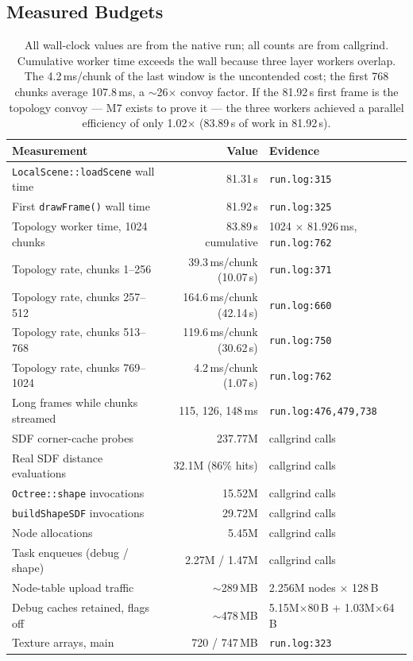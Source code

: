 \documentclass[11pt,a4paper]{article}
\begin{document}
\clearpage
\subsection{Measured Budgets}

\begin{table}[h]
\centering
\small
\begin{tabular}{@{}p{6.1cm}rp{5.0cm}@{}}
\toprule
\textbf{Measurement} & \textbf{Value} & \textbf{Evidence} \\
\midrule
\texttt{LocalScene::loadScene} wall time & 81.31\,s & \texttt{run.log:315} \\
First \texttt{drawFrame()} wall time & 81.92\,s & \texttt{run.log:325} \\
Topology worker time, 1024 chunks & 83.89\,s cumulative & 1024 $\times$ 81.926\,ms, \texttt{run.log:762} \\
Topology rate, chunks 1--256 & 39.3\,ms/chunk (10.07\,s) & \texttt{run.log:371} \\
Topology rate, chunks 257--512 & 164.6\,ms/chunk (42.14\,s) & \texttt{run.log:660} \\
Topology rate, chunks 513--768 & 119.6\,ms/chunk (30.62\,s) & \texttt{run.log:750} \\
Topology rate, chunks 769--1024 & 4.2\,ms/chunk (1.07\,s) & \texttt{run.log:762} \\
Long frames while chunks streamed & 115, 126, 148\,ms & \texttt{run.log:476,479,738} \\
SDF corner-cache probes & 237.77M & callgrind calls \\
Real SDF distance evaluations & 32.1M (86\% hits) & callgrind calls \\
\texttt{Octree::shape} invocations & 15.52M & callgrind calls \\
\texttt{buildShapeSDF} invocations & 29.72M & callgrind calls \\
Node allocations & 5.45M & callgrind calls \\
Task enqueues (debug / shape) & 2.27M / 1.47M & callgrind calls \\
Node-table upload traffic & $\sim$289\,MB & 2.256M nodes $\times$ 128\,B \\
Debug caches retained, flags off & $\sim$478\,MB & 5.15M$\times$80\,B + 1.03M$\times$64\,B \\
Texture arrays, main & 720 / 747\,MB & \texttt{run.log:323} \\
\bottomrule
\end{tabular}
\caption{All wall-clock values are from the native run; all counts are from
callgrind. Cumulative worker time exceeds the wall because three layer
workers overlap. The 4.2\,ms/chunk of the last window is the uncontended
cost; the first 768 chunks average 107.8\,ms, a $\sim$26$\times$ convoy
factor. If the 81.92\,s first frame is the topology convoy --- M7 exists to
prove it --- the three workers achieved a parallel efficiency of only 1.02$\times$
(83.89\,s of work in 81.92\,s).}
\end{table}
\end{document}
